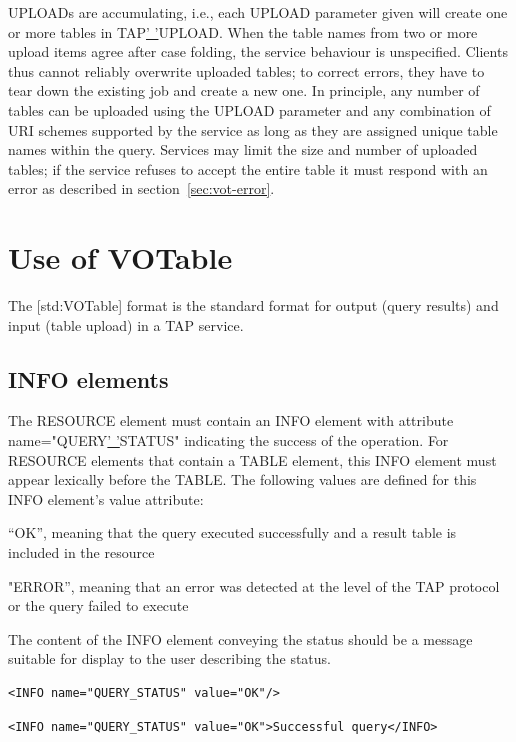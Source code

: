 \documentclass[11pt,letter]{ivoa}
\begin{document}
{UPLOADs are accumulating, i.e., each UPLOAD parameter given will create one or 
more tables in TAP\underline{' '}UPLOAD. When the table names from two or more 
upload items agree after case folding, the service behaviour is unspecified. 
Clients thus cannot reliably overwrite uploaded tables; to correct errors, they 
have to tear down the existing job and create a new one. In principle, any 
number of tables can be uploaded using the UPLOAD parameter and any combination 
of URI schemes supported by the service as long as they are assigned unique 
table names within the query. Services may limit the size and number of 
uploaded tables; if the service refuses to accept the entire table it must 
respond with an error as described in section~\ref{sec:vot-error}.


\section{Use of VOTable}
\label{sec:votable}

The [std:VOTable] format is the standard format for output (query results) and 
input (table upload) in a TAP service. 


\subsection{INFO elements}
\label{sec:vot-info}

The RESOURCE element must contain an INFO element with attribute 
name="QUERY\underline{' '}STATUS" indicating the success of the operation. For 
RESOURCE elements that contain a TABLE element, this INFO element must appear 
lexically before the TABLE. The following values are defined for this INFO 
element's value attribute:

“OK”, meaning that the query executed successfully and a result table is 
included in the resource 

"ERROR”, meaning that an error was detected at the level of the TAP 
protocol or the query failed to execute 

The content of the INFO element conveying the status should be a message 
suitable for display to the user describing the status.

\begin{verbatim}
<INFO name="QUERY_STATUS" value="OK"/>
\end{verbatim}
 
\begin{verbatim}
<INFO name="QUERY_STATUS" value="OK">Successful query</INFO>
\end{verbatim}

}
\end{document}
